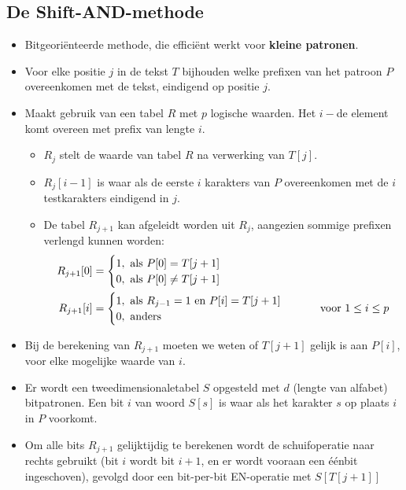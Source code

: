\subsection{De Shift-AND-methode}
\begin{itemize}
    \item Bitgeoriënteerde methode, die efficiënt werkt voor \textbf{kleine patronen}.
    \item Voor elke positie $j$ in de tekst $T$ bijhouden welke prefixen van het patroon $P$ overeenkomen met de tekst, eindigend op positie $j$.
    \item Maakt gebruik van een tabel $R$ met $p$ logische waarden. Het $i-$de element komt overeen met prefix van lengte $i$.
    \begin{itemize}
        \item $R_j$ stelt de waarde van tabel $R$ na verwerking van $T[j]$.
        \item $R_j[i - 1]$ is waar als de eerste $i$ karakters van $P$ overeenkomen met de $i$ testkarakters eindigend in $j$.
        \item De tabel $R_{j+1}$ kan afgeleidt worden uit $R_j$, aangezien sommige prefixen verlengd kunnen worden:
        \begin{align*}
            R_{j + 1}[0] & = \begin{cases}
                1, \hbox{ als } P[0] = T[j + 1] \\
                0, \hbox{ als } P[0] \neq T[j + 1] \\
            \end{cases}\\
            R_{j + 1}[i] & = \begin{cases}
                1, \hbox{ als } R_{j - 1} = 1 \hbox{ en } P[i] = T[j + 1] \\
                0, \hbox{ anders }
            \end{cases} 
            \qquad \hbox{ voor } 1 \leq i \leq p
        \end{align*}
    \end{itemize}
    \item Bij de berekening van $R_{j + 1}$ moeten we weten of $T[j + 1]$ gelijk is aan $P[i]$, voor elke mogelijke waarde van $i$.
    \item Er wordt een tweedimensionaletabel $S$ opgesteld met $d$ (lengte van alfabet) bitpatronen. Een bit $i$ van woord $S[s]$ is waar als het karakter $s$ op plaats $i$ in $P$ voorkomt.

    \item Om alle bits $R_{j + 1}$ gelijktijdig te berekenen wordt de schuifoperatie naar rechts gebruikt (bit $i$ wordt bit $i + 1$, en er wordt vooraan een éénbit ingeschoven), gevolgd door een bit-per-bit EN-operatie met $S[T[j + 1]]$
    

\end{itemize}
